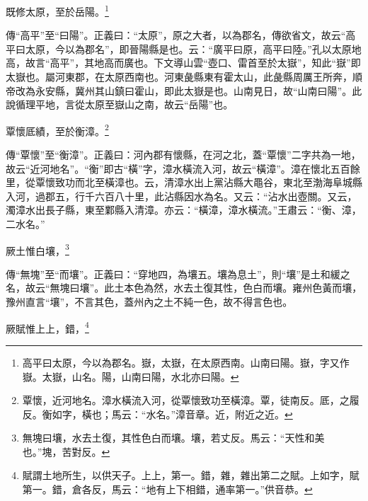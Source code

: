 既修太原，至於岳陽。\footnote{高平曰太原，今以為郡名。嶽，太嶽，在太原西南。山南曰陽。嶽，字又作嶽。太嶽，山名。陽，山南曰陽，水北亦曰陽。}

{\noindent\zhuan{}\fzbyks 傳“高平”至“曰陽”。正義曰：“太原”，原之大者，以為郡名，傳欲省文，故云“高平曰太原，今以為郡名”，即晉陽縣是也。云：“廣平曰原，高平曰陸。”孔以太原地高，故言“高平”，其地高而廣也。下文導山雲“壺口、雷首至於太嶽”，知此“嶽”即太嶽也。屬河東郡，在太原西南也。河東彘縣東有霍太山，此彘縣周厲王所奔，順帝改為永安縣，冀州其山鎮曰霍山，即此太嶽是也。山南見日，故“山南曰陽”。此說循理平地，言從太原至嶽山之南，故云“岳陽”也。 \par}

覃懷厎績，至於衡漳。\footnote{覃懷，近河地名。漳水橫流入河，從覃懷致功至橫漳。覃，徒南反。厎，之履反。衡如字，橫也；馬云：“水名。”漳音章。近，附近之近。}

{\noindent\zhuan{}\fzbyks 傳“覃懷”至“衡漳”。正義曰：河內郡有懷縣，在河之北，蓋“覃懷”二字共為一地，故云“近河地名”。“衡”即古“橫”字，漳水橫流入河，故云“橫漳”。漳在懷北五百餘里，從覃懷致功而北至橫漳也。云，清漳水出上黨沾縣大黽谷，東北至渤海阜城縣入河，過郡五，行千六百八十里，此沾縣因水為名。又云：“沾水出壺關。又云，濁漳水出長子縣，東至鄴縣入清漳。亦云：“橫漳，漳水橫流。”王肅云：“衡、漳，二水名。” \par}

厥土惟白壤，\footnote{無塊曰壤，水去土復，其性色白而壤。壤，若丈反。馬云：“天性和美也。”塊，苦對反。}

{\noindent\zhuan{}\fzbyks 傳“無塊”至“而壤”。正義曰：“穿地四，為壤五。壤為息土”，則“壤”是土和緩之名，故云“無塊曰壤”。此土本色為然，水去土復其性，色白而壤。雍州色黃而壤，豫州直言“壤”，不言其色，蓋州內之土不純一色，故不得言色也。 \par}

厥賦惟上上，錯，\footnote{賦謂土地所生，以供天子。上上，第一。錯，雜，雜出第二之賦。上如字，賦第一。錯，倉各反，馬云：“地有上下相錯，通率第一。”供音恭。}

